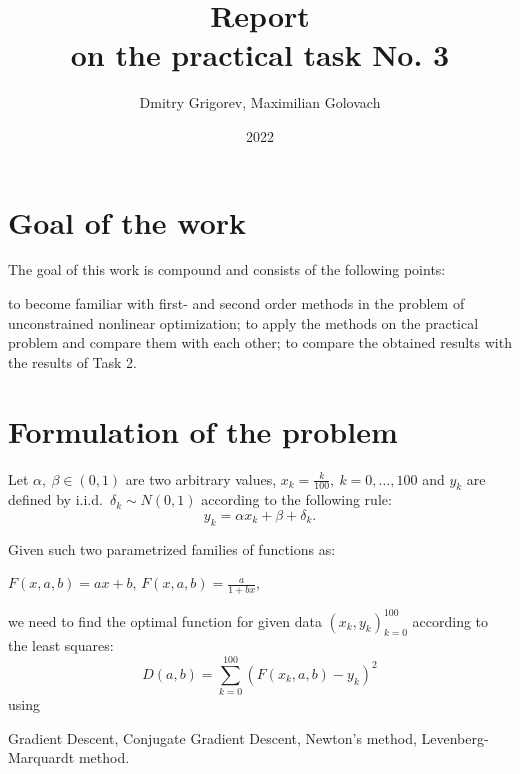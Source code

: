 \documentclass[12pt, bachelor, substylefile = algo_title.rtx]{disser}
\theoremstyle{definition}
\begin{document}
\title{Report\\
on the practical task No. 3}


\author{Dmitry Grigorev, Maximilian Golovach}
\sastatus {}

\date{2022}

\maketitle
\section{Goal of the work}
The goal of this work is compound and consists of the following points:
\begin{outline}
\1 to become familiar with first- and second order methods in the problem of unconstrained nonlinear optimization;
\1 to apply the methods on the practical problem and compare them with each other;
\1 to compare the obtained results with the results of Task 2.
\end{outline}

\section{Formulation of the problem}
\label{sec: probsetup}
Let $\alpha,\ \beta \in (0, 1)$ are two arbitrary values, $x_k = \frac{k}{100},\ k  = 0, \dots, 100$ and $y_k$ are defined by i.i.d.~$\delta_k \sim N(0, 1) $ according to the following rule:
\[ y_k = \alpha x_k + \beta + \delta_k.\]

Given such two parametrized families of functions as:
\begin{outline}[enumerate]
\1 $F(x, a, b) = ax + b$,
\1 $F(x, a, b) = \frac{a}{1+bx}$,
\end{outline}
we need to find the optimal function for given data $(x_k, y_k)_{k = 0}^{100}$ according to the least squares:
\[ D(a, b) = \sum_{k=0}^{100} (F(x_k, a, b) - y_k)^2 \]
using
\begin{outline}
\1 Gradient Descent,
\1 Conjugate Gradient Descent,
\1 Newton's method,
\1 Levenberg-Marquardt method.
\end{outline}
\end{document}

